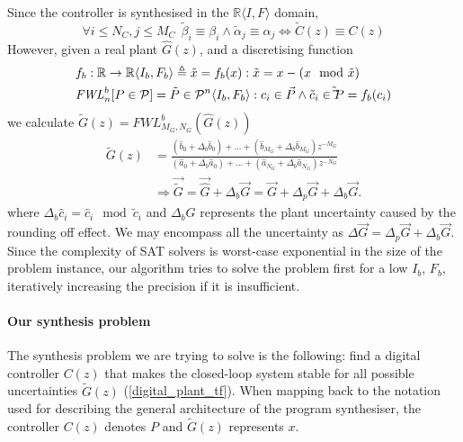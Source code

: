 \documentclass{sig-alternate-05-2015}
\begin{document}
Since the controller is synthesised in the $\mathbb{R}\langle I,F \rangle$
domain,
%
 $$\forall i \leq N_C, j \leq M_C\ \  \tilde \beta_{i} \equiv \beta_{i} \wedge \tilde \alpha_{j} \equiv \alpha_{j} \Leftrightarrow \tilde C(z) \equiv C(z)$$
%
However, given a real plant $\hat{G}(z)$, and a discretising function
%
\begin{align}
\small
\label{FWL_tf}
&f_b : \mathbb{R} \rightarrow  \mathbb{R}\langle I_b,F_b \rangle \triangleq \tilde x = f_b(x) : \tilde x=x-(x\mod\tilde x)\\
&\mathit{FWL}_n^b[P \in \mathcal{P}] = \tilde P \in \mathcal{P}^{n}\langle I_b,F_b \rangle : c_i \in \vec{P} \wedge \tilde c_i \in \tilde \vec{P}=f_b(c_i)  \nonumber
\end{align}
%
we calculate $\tilde G(z)=FWL_{M_G,N_G}^b(\hat{G}(z))$
%
\begin{align}
\label{digital_plant_tf}
\tilde G(z)&=\frac{(\hat{b}_{0}+\Delta_b \hat{b}_{0}) +...+(\hat{b}_{M_G}+\Delta_b \hat{b}_{M_G})z^{-M_G}}{(\hat{a}_{0}+\Delta_b \hat{a}_{0})+...+(\hat{a}_{N_G}+\Delta_b \hat{a}_{N_G})z^{-N_G}} \nonumber \\
&\Rightarrow \vec{\tilde G} =\vec{\hat{G}}+\Delta_b{\vec{G}}=\vec{G}+\Delta_p{\vec{G}}+\Delta_b{\vec{G}}.
\end{align}
where $\Delta_b\hat{c}_i=\hat{c}_i\mod \tilde{c}_i$
and $\Delta_b{G}$ represents the plant uncertainty caused by
the rounding off effect.  We may encompass all the uncertainty as
$\Delta{\vec{G}}=\Delta_p{\vec{G}}+\Delta_b{\vec{G}}$. 
Since the complexity of SAT solvers is worst-case exponential in the size of
the problem instance, our algorithm tries to solve the problem first for a
low $I_b$, $F_b$, iteratively increasing the precision if it is insufficient.

\paragraph{Our synthesis problem}
The synthesis problem we are trying to solve is the following:
find a digital controller $C(z)$ %
that makes the closed-loop system stable 
for all possible uncertainties 
$\tilde G(z)$ (\ref{digital_plant_tf}).
When mapping back to the notation used for describing the general architecture 
of the program synthesiser, the controller $C(z)$ denotes $P$ and 
$\tilde G(z)$ represents $x$. 
\end{document}
